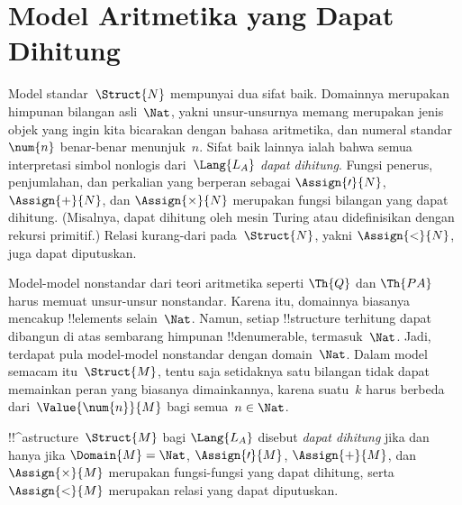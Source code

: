 \documentclass[../../../include/open-logic-section]{subfiles}
\begin{document}
\section{Model Aritmetika yang Dapat Dihitung}

\begin{explain}
Model standar~$\Struct{N}$ mempunyai dua sifat baik. Domainnya merupakan
himpunan bilangan asli~$\Nat$, yakni unsur-unsurnya memang merupakan jenis
objek yang ingin kita bicarakan dengan bahasa aritmetika, dan numeral standar~$\num{n}$
benar-benar menunjuk~$n$. Sifat baik lainnya ialah bahwa semua interpretasi
simbol nonlogis dari~$\Lang{L_A}$ \emph{dapat dihitung}. Fungsi penerus,
penjumlahan, dan perkalian yang berperan sebagai $\Assign{\prime}{N}$,
$\Assign{+}{N}$, dan $\Assign{\times}{N}$ merupakan fungsi bilangan yang dapat
dihitung. (Misalnya, dapat dihitung oleh mesin Turing atau didefinisikan
dengan rekursi primitif.) Relasi kurang-dari pada~$\Struct{N}$, yakni
$\Assign{<}{N}$, juga dapat diputuskan.

Model-model nonstandar dari teori aritmetika seperti $\Th{Q}$ dan $\Th{PA}$
harus memuat unsur-unsur nonstandar. Karena itu, domainnya biasanya mencakup
!!{element}s selain~$\Nat$. Namun, setiap !!{structure} terhitung dapat
dibangun di atas sembarang himpunan !!{denumerable}, termasuk~$\Nat$. Jadi,
terdapat pula model-model nonstandar dengan domain~$\Nat$. Dalam model
semacam itu~$\Struct{M}$, tentu saja setidaknya satu bilangan tidak dapat
memainkan peran yang biasanya dimainkannya, karena suatu~$k$ harus berbeda
dari~$\Value{\num{n}}{M}$ bagi semua~$n \in \Nat$.
\end{explain}

\begin{defn}
!!^a{structure}~$\Struct{M}$ bagi $\Lang{L_A}$ disebut \emph{dapat dihitung}
jika dan hanya jika $\Domain{M} = \Nat$, $\Assign{\prime}{M}$,
$\Assign{+}{M}$, dan $\Assign{\times}{M}$ merupakan fungsi-fungsi yang dapat
dihitung, serta $\Assign{<}{M}$ merupakan relasi yang dapat diputuskan.
\end{defn}
\end{document}
